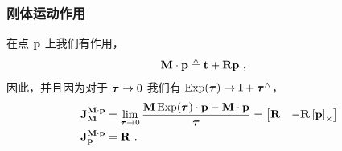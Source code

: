 \subsubsection{刚体运动作用}
\label{sec:jac_SE3_action}
%
在点 ${\bf p}$ 上我们有作用，
%
\begin{align}
{\bf M}\cdot{\bf p} &\triangleq {\bf t}+{\bf R}{\bf p}
~,
\end{align}
%
因此，并且因为对于 ${{\bm \tau}}\to0$ 我们有 $\operatorname*{Exp}({\bm \tau})\to{\bf I}+{\bm \tau}^\wedge$，
%
\begin{align}
{{\bf J}^{{\bf M}\cdot{\bf p}}_{{\bf M}}} 
  &= 
  \lim_{{\bm \tau}\to0}\frac{{\bf M}\operatorname*{Exp}({\bm \tau})\cdot{\bf p} - {\bf M}\cdot{\bf p}}{{\bm \tau}}
  = \begin{bmatrix}{\bf R} & -{\bf R}\left[{\bf p}\right]_\times \end{bmatrix} \\
{{\bf J}^{{\bf M}\cdot{\bf p}}_{{\bf p}}} &= {\bf R}
~.
\end{align}
